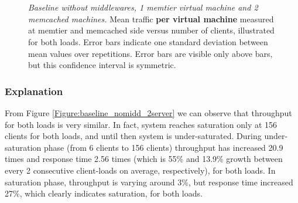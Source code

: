 \documentclass[11pt,a4paper]{article}
\begin{document}
\begin{figure}[ht!]
	\centering	
	\\
	\\
	\caption{\textit{Baseline without middlewares, 1 memtier virtual machine and 2 memcached machines.} Mean traffic \textbf{per virtual machine} measured at memtier and memcached side versus number of clients, illustrated for both loads. Error bars indicate one standard deviation between mean values over repetitions. Error bars are visible only above bars, but this confidence interval is symmetric.}
	\label{Figure:baseline_nomidd_2server_dstat} 	
\end{figure}

\subsubsection{Explanation}

From Figure \ref{Figure:baseline_nomidd_2server} we can observe that throughput for both loads is very similar. In fact, system reaches saturation only at 156 clients for both loads, and until then system is under-saturated. During under-saturation phase (from 6 clients to 156 clients) throughput has increased 20.9 times and response time 2.56 times (which is 55\% and 13.9\% growth between every 2 consecutive client-loads on average, respectively), for both loads. In saturation phase, throughput is varying around 3\%, but response time increased 27\%, which clearly indicates saturation, for both loads.
\end{document}
